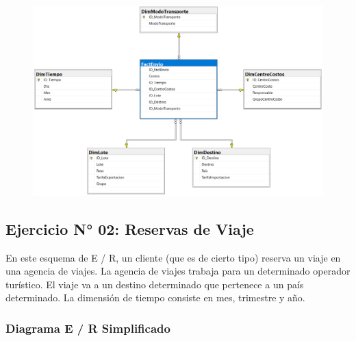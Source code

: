 \documentclass{article}
\begin{document}
	\begin{figure}[htb]
		\begin{center}
			\includegraphics[width=15cm]{./images/Ejercicio1_DiagramaFisico}
			
		\end{center}
	\end{figure}

\newpage


\subsection{Ejercicio N° 02: Reservas de Viaje}

En este esquema de E / R, un cliente (que es de cierto tipo) reserva un viaje en una agencia de viajes. La agencia de viajes trabaja para un determinado operador turístico. El viaje va a un destino determinado que pertenece a un país determinado. La dimensión de tiempo consiste en mes, trimestre y año.



\subsubsection{\textbf{Diagrama E / R Simplificado}}
\end{document}
